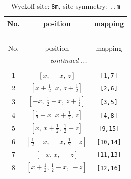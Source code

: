 \documentclass[fleqn,8pt]{jsarticle}
\begin{document}
\begin{longtable}{ccc}
\caption{Wyckoff site: {\tt 8m}, site symmetry: {\tt ..m}}
 \\
 \hline \hline
No. & position & mapping \\ \hline \endfirsthead

\multicolumn{2}{l}{\tablename\ \thetable{}} \\
 \hline \hline
No. & position & mapping \\ \hline \endhead

 \hline \hline
\multicolumn{2}{r}{\footnotesize\it continued ...} \\ \endfoot

 \hline \hline
\multicolumn{2}{r}{} \\ \endlastfoot

1 & $\left[ x,\, - x,\, z \right]$ & {\tt [1,7]} \\ \hline
2 & $\left[ x + \frac{1}{2},\, x,\, z + \frac{1}{2} \right]$ & {\tt [2,6]} \\ \hline
3 & $\left[ - x,\, \frac{1}{2} - x,\, z + \frac{1}{2} \right]$ & {\tt [3,5]} \\ \hline
4 & $\left[ \frac{1}{2} - x,\, x + \frac{1}{2},\, z \right]$ & {\tt [4,8]} \\ \hline
5 & $\left[ x,\, x + \frac{1}{2},\, \frac{1}{2} - z \right]$ & {\tt [9,15]} \\ \hline
6 & $\left[ \frac{1}{2} - x,\, - x,\, \frac{1}{2} - z \right]$ & {\tt [10,14]} \\ \hline
7 & $\left[ - x,\, x,\, - z \right]$ & {\tt [11,13]} \\ \hline
8 & $\left[ x + \frac{1}{2},\, \frac{1}{2} - x,\, - z \right]$ & {\tt [12,16]} \\
\end{longtable}
\renewcommand{\arraystretch}{1.2}
\end{document}
